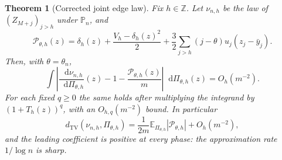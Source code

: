 \documentclass[11pt,a4paper]{article}
\numberwithin{equation}{section}
\newtheorem{theorem}{Theorem}[section]
\theoremstyle{definition}
\theoremstyle{remark}
\newcommand{\Z}{\mathbb Z}
\newcommand{\dd}{\mathop{}\!\mathrm d}
\newcommand{\PP}{\mathbb P}
\newcommand{\E}{\mathbb E}
\newcommand{\TV}{d_{\mathrm{TV}}}
\begin{document}
\begin{theorem}[Corrected joint edge law]\label{ctp:cl:thm:edge}
Fix $h\in\Z$. Let $\nu_{n,h}$ be the law of $(Z_{M+j})_{j>h}$ under $\PP_n$,
and
\begin{equation}\label{ctp:cl:eq:score}
 \mathcal P_{\theta,h}(z)=\delta_h(z)+\frac{V_h-\delta_h(z)^2}2
 +\frac32\sum_{j>h}(j-\theta)u_j(z_j-\bar y_j).
\end{equation}
Then, with $\theta=\theta_n$,
\begin{equation}\label{ctp:cl:eq:edgeexp}
 \int\left|\frac{\dd\nu_{n,h}}{\dd\Pi_{\theta,h}}(z)-1
 -\frac{\mathcal P_{\theta,h}(z)}m\right|\dd\Pi_{\theta,h}(z)=O_h(m^{-2}).
\end{equation}
For each fixed $q\ge0$ the same holds after multiplying the integrand by
$(1+T_h(z))^q$, with an $O_{h,q}(m^{-2})$ bound. In particular
\begin{equation}\label{ctp:cl:eq:edge-tv-sharp}
 \TV(\nu_{n,h},\Pi_{\theta,h})=\frac1{2m}\E_{\Pi_{\theta,h}}|\mathcal P_{\theta,h}|+O_h(m^{-2}),
\end{equation}
and the leading coefficient is positive at every phase: the approximation
rate $1/\log n$ is sharp.
\end{theorem}
\end{document}
